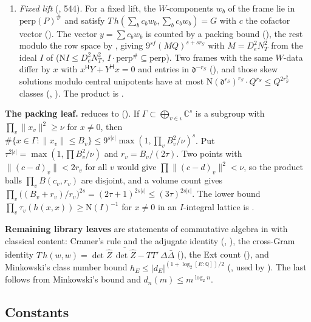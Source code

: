 \documentclass[11pt]{article}
\newcommand{\N}{\mathrm N}
\begin{document}
\begin{enumerate}[leftmargin=*]
\begin{enumerate}
 \item \emph{Fixed lift} (, 544). For a fixed lift, the $W$-components $w_b$ of the frame lie in $\mathrm{perp}(P)^\#$ and satisfy $T\,h(\sum_b c_bw_b,\sum_bc_bw_b)=G$ with $c$ the cofactor vector (). The vector $y=\sum c_bw_b$ is counted by a packing bound (), the rest modulo the row space by , giving $9^{sf}(MQ)^{s+sr_S}$ with $M=D_e^2N_T^2$ from the ideal $I$ of  ($\N I\le D_e^2N_T^2$, $I\cdot\mathrm{perp}^\#\subseteq\mathrm{perp}$). Two frames with the same $W$-data differ by $x$ with $x^{\mathsf H}Y+Y^{\mathsf H}x=0$ and entries in $\mathfrak d^{-r_S}$ (), and those skew solutions modulo central unipotents have at most $\N(\mathfrak d^{r_S})^{r_S}\cdot Q^{r_S}\le Q^{2r_S^2}$ classes (, ). The product is .
 \end{enumerate}
\end{enumerate}

\textbf{The packing leaf.}  reduces to  (). If $\Gamma\subset\bigoplus_{v\in\iota}\mathbb C^s$ is a subgroup with $\prod_v\|x_v\|^2\ge\nu$ for $x\ne0$, then $\#\{x\in\Gamma:\|x_v\|\le B_v\}\le 9^{s|\iota|}\max(1,\prod_vB_v^2/\nu)^s$. Put $\tau^{2|\iota|}=\max(1,\prod B_v^2/\nu)$ and $r_v=B_v/(2\tau)$. Two points with $\|(c-d)_v\|<2r_v$ for all $v$ would give $\prod\|(c-d)_v\|^2<\nu$, so the product balls $\prod_vB(c_v,r_v)$ are disjoint, and a volume count gives $\prod_v\bigl((B_v+r_v)/r_v\bigr)^{2s}=(2\tau+1)^{2s|\iota|}\le(3\tau)^{2s|\iota|}$. The lower bound $\prod_v\tau_v(h(x,x))\ge\N(I)^{-1}$ for $x\ne0$ in an $I$-integral lattice is .

\textbf{Remaining library leaves} are statements of commutative algebra in  with classical content: Cramer's rule and the adjugate identity (, ), the cross-Gram identity $T\,h(w,w)=\det\hat Z\,\overline{\det\hat Z}-TT'\,\Delta\bar\Delta$ (), the Ext count (), and Minkowski's class number bound $h_E\le|d_E|^{(1+\log_2[E:\mathbb Q])/2}$ (, used by ). The last follows from Minkowski's bound and $d_n(m)\le m^{\log_2n}$.

\subsection{Constants}
\end{document}
